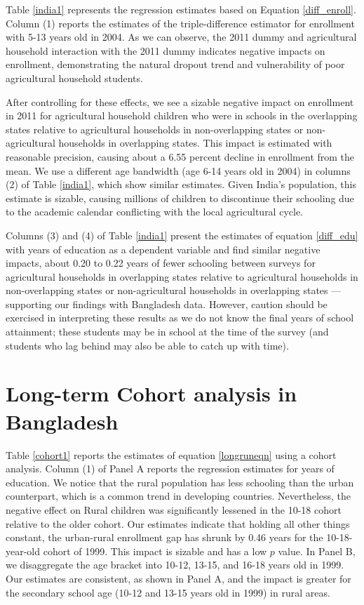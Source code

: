 \documentclass[12pt,letterpaper]{article}\usepackage[margin=1in]{geometry}
\newcommand{\0}{\ensuremath{\mbox{\boldmath $0$}}}
\begin{document}



Table \ref{india1} represents the regression estimates based on Equation \ref{diff_enroll}. Column (1) reports the estimates of the triple-difference estimator for enrollment with 5-13 years old in 2004. As we can observe, the 2011 dummy and agricultural household interaction with the 2011 dummy indicates negative impacts on enrollment, demonstrating the natural dropout trend and vulnerability of poor agricultural household students.

After controlling for these effects, we see a sizable negative impact on enrollment in 2011 for agricultural household children who were in schools in the overlapping states relative to agricultural households in non-overlapping states or non-agricultural households in overlapping states. This impact is estimated with reasonable precision, causing about a 6.55 percent decline in enrollment from the mean. We use a different age bandwidth (age 6-14 years old in 2004) in columns (2) of Table \ref{india1}, which show similar estimates. Given India's population, this estimate is sizable, causing millions of children to discontinue their schooling due to the academic calendar conflicting with the local agricultural cycle.  

Columns (3) and (4) of Table \ref{india1} present the estimates of equation \ref{diff_edu} with years of education as a dependent variable and find similar negative impacts, about 0.20 to 0.22 years of fewer schooling between surveys for agricultural households in overlapping states relative to agricultural households in non-overlapping states or non-agricultural households in overlapping states --- supporting our findings with Bangladesh data. However, caution should be exercised in interpreting these results as we do not know the final years of school attainment; these students may be in school at the time of the survey (and students who lag behind may also be able to catch up with time).


\section{Long-term Cohort analysis in Bangladesh\label{sec.long-term}}


Table \ref{cohort1} reports the estimates of equation \eqref{longruneqn} using a cohort analysis. Column (1) of Panel A reports the regression estimates for years of education. We notice that the rural population has less schooling than the urban counterpart, which is a common trend in developing countries. Nevertheless, the negative effect on Rural children was significantly lessened in the 10-18 cohort relative to the older cohort. Our estimates indicate that holding all other things constant, the urban-rural enrollment gap has shrunk by 0.46 years for the 10-18-year-old cohort of 1999. This impact is sizable and has a low $p$ value. In Panel B, we disaggregate the age bracket into 10-12, 13-15, and 16-18 years old in 1999. Our estimates are consistent, as shown in Panel A, and the impact is greater for the secondary school age (10-12 and 13-15 years old in 1999) in rural areas. 
\end{document}
